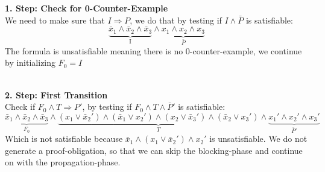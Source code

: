 \documentclass[11pt, a4paper, BCOR=10mm, ngerman]{scrbook}
\begin{document}
\textbf{1. Step: Check for 0-Counter-Example} \\ We need to make sure that $ I \Rightarrow P$, we do that by testing if $I \land \bar P$ is satisfiable:
\begin{equation*}
\underbrace{\bar x_1 \land \bar x_2 \land \bar x_3}_{\text{I}} \land \underbrace{x_1 \land x_2 \land x_3}_{ \bar P}
\end{equation*}
The formula is unsatisfiable meaning there is no 0-counter-example, we continue by initializing $F_0 = I$ \\ \\  \par

\textbf{2. Step: First Transition}\\
Check if $F_0 \land T \Rightarrow P'$, by testing if $F_0 \land T \land \bar P'$ is satisfiable: 
\begin{equation*}
\underbrace{\bar x_1 \land \bar x_2 \land \bar x_3}_{F_0} \land \underbrace{(x_1 \lor \bar x_2' ) \land ( \bar x_1 \lor x_2') \land (x_2 \lor \bar x_3') \land ( \bar x_2 \lor x_3')}_{T} \land \underbrace{ x_1' \land x_2' \land x_3'}_{\bar P'}
\end{equation*}
Which is not satisfiable because $\bar x_1 \land (x_1 \lor \bar x_2') \land x_2'$ is unsatisfiable. We do not generate a proof-obligation, so that we can skip the blocking-phase and continue on with the propagation-phase. \\ \\ \par
\end{document}
